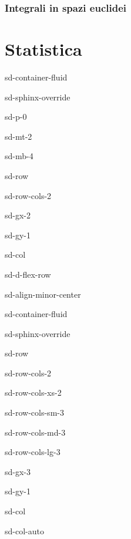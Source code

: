 \documentclass[letterpaper,10pt,italian]{jupyterBook}
\begin{document}
\sphinxstepscope


\section{Integrali in spazi euclidei}
\label{\detokenize{ch/vector-calculus/integrals:integrali-in-spazi-euclidei}}\label{\detokenize{ch/vector-calculus/integrals:vector-calculus-integrals}}\label{\detokenize{ch/vector-calculus/integrals::doc}}
\sphinxstepscope


\part{Statistica}

\sphinxstepscope

\begin{sphinxuseclass}{sd-container-fluid}
\begin{sphinxuseclass}{sd-sphinx-override}
\begin{sphinxuseclass}{sd-p-0}
\begin{sphinxuseclass}{sd-mt-2}
\begin{sphinxuseclass}{sd-mb-4}
\begin{sphinxuseclass}{sd-row}
\begin{sphinxuseclass}{sd-row-cols-2}
\begin{sphinxuseclass}{sd-gx-2}
\begin{sphinxuseclass}{sd-gy-1}
\begin{sphinxuseclass}{sd-col}
\begin{sphinxuseclass}{sd-d-flex-row}
\begin{sphinxuseclass}{sd-align-minor-center}
\begin{sphinxuseclass}{sd-container-fluid}
\begin{sphinxuseclass}{sd-sphinx-override}
\begin{sphinxuseclass}{sd-row}
\begin{sphinxuseclass}{sd-row-cols-2}
\begin{sphinxuseclass}{sd-row-cols-xs-2}
\begin{sphinxuseclass}{sd-row-cols-sm-3}
\begin{sphinxuseclass}{sd-row-cols-md-3}
\begin{sphinxuseclass}{sd-row-cols-lg-3}
\begin{sphinxuseclass}{sd-gx-3}
\begin{sphinxuseclass}{sd-gy-1}
\begin{sphinxuseclass}{sd-col}
\begin{sphinxuseclass}{sd-col-auto}

\end{sphinxuseclass}
\end{sphinxuseclass}
\end{sphinxuseclass}
\end{sphinxuseclass}
\end{sphinxuseclass}
\end{sphinxuseclass}
\end{sphinxuseclass}
\end{sphinxuseclass}
\end{sphinxuseclass}
\end{sphinxuseclass}
\end{sphinxuseclass}
\end{sphinxuseclass}
\end{sphinxuseclass}
\end{sphinxuseclass}
\end{sphinxuseclass}
\end{sphinxuseclass}
\end{sphinxuseclass}
\end{sphinxuseclass}
\end{sphinxuseclass}
\end{sphinxuseclass}
\end{sphinxuseclass}
\end{sphinxuseclass}
\end{sphinxuseclass}
\end{sphinxuseclass}
\end{document}
